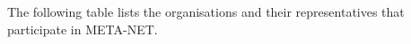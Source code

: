 The following table lists the organisations and their representatives that participate in META-NET.
